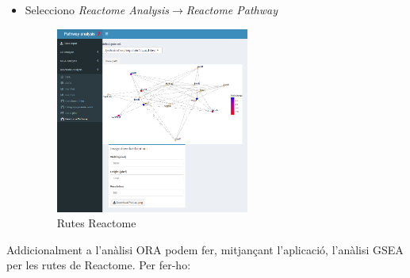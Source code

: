 \begin{enumerate}
\begin{itemize}
\item Selecciono \textit{Reactome Analysis}$\rightarrow$\textit{Reactome Pathway}
\begin{figure}[H]
\centering
\includegraphics[width=0.6\textwidth]{figures/Estudi1_Fig8_ORA_PP_RA.png} 
\caption{Rutes Reactome}
\end{figure}
\end{itemize}
\end{enumerate}

Addicionalment a l'anàlisi \gls{ORA} podem fer, mitjançant l'aplicació, l'anàlisi \gls{GSEA} per les rutes de Reactome. Per fer-ho:

